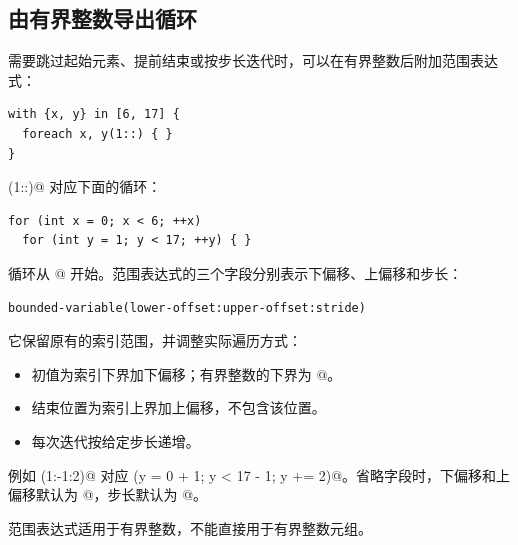 \subsection*{由有界整数导出循环}

需要跳过起始元素、提前结束或按步长迭代时，可以在有界整数后附加范围表达式：

\begin{lstlisting}[language=croqtile,caption={一组有界变量}]
with {x, y} in [6, 17] {
  foreach x, y(1::) { }
}
\end{lstlisting}

\co@y(1::)@ 对应下面的循环：

\begin{lstlisting}[language=croqtile,caption={导出的 C++ 循环}]
for (int x = 0; x < 6; ++x)
  for (int y = 1; y < 17; ++y) { }
\end{lstlisting}

循环从 @ 开始。范围表达式的三个字段分别表示下偏移、上偏移和步长：

\begin{lstlisting}[language=croqtile,caption={有界变量的语法}]
  bounded-variable(lower-offset:upper-offset:stride)
\end{lstlisting}

它保留原有的索引范围，并调整实际遍历方式：

\begin{itemize}[leftmargin=1.6em]
\item 初值为索引下界加下偏移；有界整数的下界为 @。
\item 结束位置为索引上界加上偏移，不包含该位置。
\item 每次迭代按给定步长递增。
\end{itemize}

例如 \co@y(1:-1:2)@ 对应 \co@for (y = 0 + 1; y < 17 - 1; y += 2)@。省略字段时，下偏移和上偏移默认为 @，步长默认为 @。

范围表达式适用于有界整数，不能直接用于有界整数元组。

